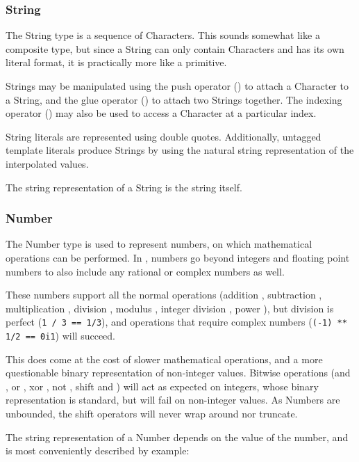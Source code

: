\subsubsection{String}

The String type is a sequence of Characters. This sounds somewhat like
a composite type, but since a String can only contain Characters and has
its own literal format, it is practically more like a primitive.

Strings may be manipulated using the push operator (\op{+}) to attach a
Character to a String, and the glue operator (\op{<>}) to attach two
Strings together. The indexing operator () may also be used to
access a Character at a particular index.

String literals are represented using double quotes. Additionally,
untagged template literals produce Strings by using the natural
string representation of the interpolated values.

The string representation of a String is the string itself.

\subsubsection{Number}

The Number type is used to represent numbers, on which mathematical
operations can be performed. In \Trilogy{}, numbers go beyond integers
and floating point numbers to also include any rational or complex
numbers as well.

These numbers support all the normal operations (addition \op{+},
subtraction \op{-}, multiplication \op{*}, division \op{/},
modulus \op{\%}, integer division \op{//}, power \op{**}), but
division is perfect (\texttt{1 / 3 == 1/3}), and operations that
require complex numbers (\texttt{(-1) ** 1/2 == 0i1}) will succeed.

This does come at the cost of slower mathematical operations, and a
more questionable binary representation of non-integer values. Bitwise
operations (and \op{\&}, or \op{|}, xor \op{\textasciicircum}, not
\op{\textasciitilde}, shift \op{\textasciitilde>} and \op{<\textasciitilde})
will act as expected on integers, whose binary representation is
standard, but will fail on non-integer values. As Numbers are unbounded,
the shift operators will never wrap around nor truncate.

The string representation of a Number depends on the value of the number,
and is most conveniently described by example:

